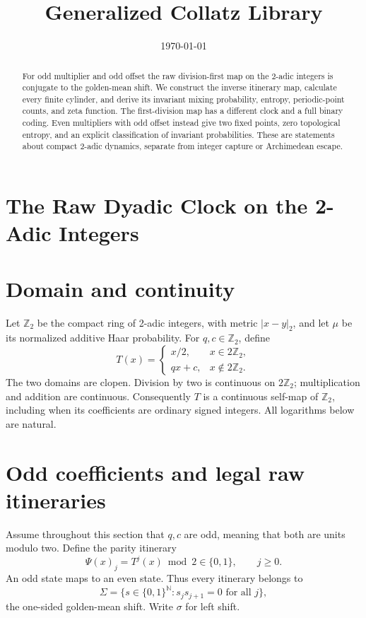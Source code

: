 \documentclass[11pt,letterpaper]{article}
\title{Generalized Collatz Library}
\author{}
\date{\today}
\newcommand{\N}{\mathbb{N}}
\newcommand{\Z}{\mathbb{Z}}
\begin{document}
\maketitle
\section*{The Raw Dyadic Clock on the 2-Adic Integers}

\begin{abstract}
For odd multiplier and odd offset the raw division-first map on the
2-adic integers is conjugate to the golden-mean shift. We construct the
inverse itinerary map, calculate every finite cylinder, and derive its
invariant mixing probability, entropy, periodic-point counts, and zeta
function. The first-division map has a different clock and a full binary
coding. Even multipliers with odd offset instead give two fixed points,
zero topological entropy, and an explicit classification of invariant
probabilities. These are statements about compact 2-adic dynamics,
separate from integer capture or Archimedean escape.
\end{abstract}

\section{Domain and continuity}

Let \(\Z_2\) be the compact ring of 2-adic integers, with metric
\(|x-y|_2\), and let \(\mu\) be its normalized additive Haar probability.
For \(q,c\in\Z_2\), define
\[
T(x)=\begin{cases}x/2,&x\in2\Z_2,\\qx+c,&x\notin2\Z_2.\end{cases}
\]
The two domains are clopen. Division by two is continuous on
\(2\Z_2\); multiplication and addition are continuous. Consequently
\(T\) is a continuous self-map of \(\Z_2\), including when its
coefficients are ordinary signed integers.
All logarithms below are natural.

\section{Odd coefficients and legal raw itineraries}

Assume throughout this section that \(q,c\) are odd, meaning that both
are units modulo two. Define the parity itinerary
\[
\Psi(x)_j=T^j(x)\bmod2\in\{0,1\},\qquad j\ge0.
\]
An odd state maps to an even state. Thus every itinerary belongs to
\[
\Sigma=\{s\in\{0,1\}^{\N}:s_j s_{j+1}=0\text{ for all }j\},
\]
the one-sided golden-mean shift. Write \(\sigma\) for left shift.
\end{document}
